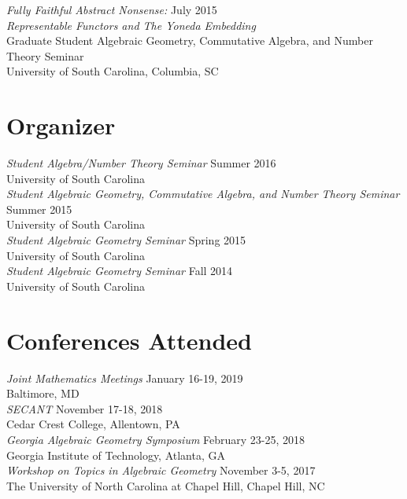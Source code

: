 \documentclass{article}
\begin{document}
\noindent\textsl{Fully Faithful Abstract Nonsense:} \hfill July 2015\\
\textsl{Representable Functors and The Yoneda Embedding}\\
Graduate Student Algebraic Geometry, Commutative Algebra, and Number Theory Seminar\\
University of South Carolina, Columbia, SC

\section*{Organizer}
\textsl{Student Algebra/Number Theory Seminar} \hfill Summer 2016\\
University of South Carolina\\

\noindent\textsl{Student Algebraic Geometry, Commutative Algebra, and Number Theory Seminar} \hfill Summer 2015\\
University of South Carolina\\

\noindent\textsl{Student Algebraic Geometry Seminar} \hfill Spring 2015\\
University of South Carolina\\

\noindent\textsl{Student Algebraic Geometry Seminar} \hfill Fall 2014\\
University of South Carolina

\section*{Conferences Attended}
\textsl{Joint Mathematics Meetings} \hfill January 16-19, 2019\\
Baltimore, MD\\

\noindent\textsl{SECANT} \hfill November 17-18, 2018\\
Cedar Crest College, Allentown, PA\\

\noindent\textsl{Georgia Algebraic Geometry Symposium} \hfill February 23-25, 2018\\
Georgia Institute of Technology, Atlanta, GA\\

\noindent\textsl{Workshop on Topics in Algebraic Geometry} \hfill November 3-5, 2017\\
The University of North Carolina at Chapel Hill, Chapel Hill, NC\\
\end{document}
